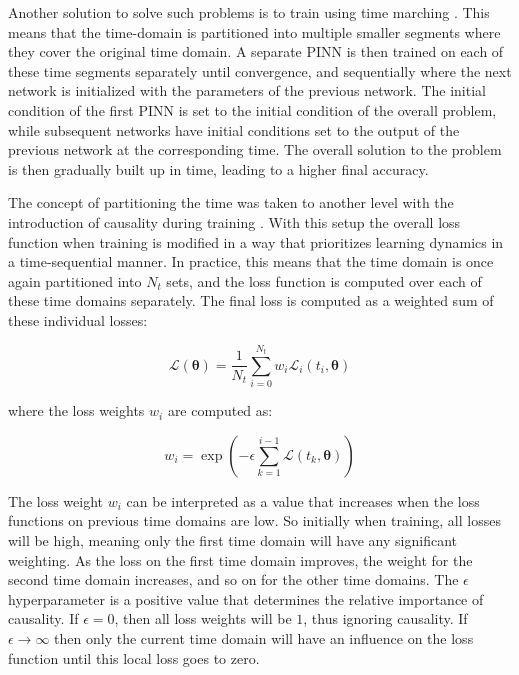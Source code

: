 Another solution to solve such problems is to train using time marching \cite{timemarching}. This means that the time-domain is partitioned into multiple smaller segments where they cover the original time domain. A separate PINN is then trained on each of these time segments separately until convergence, and sequentially where the next network is initialized with the parameters of the previous network. The initial condition of the first PINN is set to the initial condition of the overall problem, while subsequent networks have initial conditions set to the output of the previous network at the corresponding time. The overall solution to the problem is then gradually built up in time, leading to a higher final accuracy.

The concept of partitioning the time was taken to another level with the introduction of causality during training \cite{pinncausality}. With this setup the overall loss function when training is modified in a way that prioritizes learning dynamics in a time-sequential manner. In practice, this means that the time domain is once again partitioned into $N_t$ sets, and the loss function is computed over each of these time domains separately. The final loss is computed as a weighted sum of these individual losses:

\begin{equation}
    \mathcal{L}(\bm{\theta}) = \frac{1}{N_t} \sum_{i = 0}^{N_t} w_i \mathcal{L}_i(t_i, \bm{\theta})
    \label{eq:causal_loss}
\end{equation}

\noindent where the loss weights $w_i$ are computed as:

\begin{equation}
    w_i = \exp (- \epsilon \sum_{k=1}^{i - 1} \mathcal{L}(t_k, \bm{\theta}))
\end{equation}

The loss weight $w_i$ can be interpreted as a value that increases when the loss functions on previous time domains are low. So initially when training, all losses will be high, meaning only the first time domain will have any significant weighting. As the loss on the first time domain improves, the weight for the second time domain increases, and so on for the other time domains. The $\epsilon$ hyperparameter is a positive value that determines the relative importance of causality. If $\epsilon = 0$, then all loss weights will be $1$, thus ignoring causality. If $\epsilon \rightarrow \infty$ then only the current time domain will have an influence on the loss function until this local loss goes to zero.

